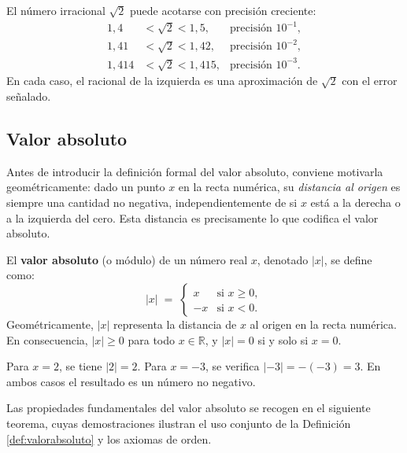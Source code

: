 \begin{example}
El número irracional $\sqrt{2}$ puede acotarse con precisión creciente:
\begin{align*}
   1{,}4   & < \sqrt{2} < 1{,}5,   & \text{precisión } 10^{-1},\\
   1{,}41  & < \sqrt{2} < 1{,}42,  & \text{precisión } 10^{-2},\\
   1{,}414 & < \sqrt{2} < 1{,}415, & \text{precisión } 10^{-3}.
\end{align*}
En cada caso, el racional de la izquierda es una aproximación de $\sqrt{2}$
con el error señalado.
\end{example}

\subsection{Valor absoluto}

Antes de introducir la definición formal del valor absoluto, conviene motivarla
geométricamente: dado un punto $x$ en la recta numérica, su \emph{distancia al
origen} es siempre una cantidad no negativa, independientemente de si $x$ está
a la derecha o a la izquierda del cero. Esta distancia es precisamente lo que
codifica el valor absoluto.

\begin{definition}\label{def:valorabsoluto}
El \textbf{valor absoluto} (o módulo) de un número real $x$, denotado $|x|$,
se define como:
\[
   |x| \;=\;
   \begin{cases}
      x  & \text{si } x \geq 0,\\
      -x & \text{si } x < 0.
   \end{cases}
\]
Geométricamente, $|x|$ representa la distancia de $x$ al origen en la recta
numérica. En consecuencia, $|x| \geq 0$ para todo $x \in \mathbb{R}$, y
$|x| = 0$ si y solo si $x = 0$.
\end{definition}

\begin{example}
Para $x = 2$, se tiene $|2| = 2$. Para $x = -3$, se verifica $|-3| = -(-3)
= 3$. En ambos casos el resultado es un número no negativo.
\end{example}

Las propiedades fundamentales del valor absoluto se recogen en el siguiente
teorema, cuyas demostraciones ilustran el uso conjunto de la Definición
\ref{def:valorabsoluto} y los axiomas de orden.

